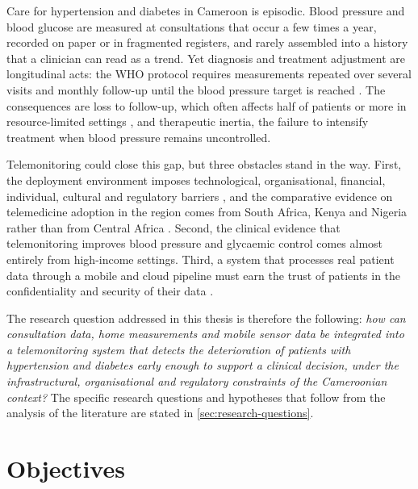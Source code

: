 Care for hypertension and diabetes in Cameroon is episodic. Blood pressure and blood glucose are measured at consultations that occur a few times a year, recorded on paper or in fragmented registers, and rarely assembled into a history that a clinician can read as a trend. Yet diagnosis and treatment adjustment are longitudinal acts: the WHO protocol requires measurements repeated over several visits and monthly follow-up until the blood pressure target is reached \parencite{who2021guideline,who2023hypertension}. The consequences are loss to follow-up, which often affects half of patients or more in resource-limited settings \parencite{who2023hypertension}, and therapeutic inertia, the failure to intensify treatment when blood pressure remains uncontrolled.

Telemonitoring could close this gap, but three obstacles stand in the way. First, the deployment environment imposes technological, organisational, financial, individual, cultural and regulatory barriers \parencite{dodoo2022}, and the comparative evidence on telemedicine adoption in the region comes from South Africa, Kenya and Nigeria rather than from Central Africa \parencite{agbeyangi2025}. Second, the clinical evidence that telemonitoring improves blood pressure and glycaemic control comes almost entirely from high-income settings. Third, a system that processes real patient data through a mobile and cloud pipeline must earn the trust of patients in the confidentiality and security of their data \parencite{alhammad2024}.

The research question addressed in this thesis is therefore the following: \emph{how can consultation data, home measurements and mobile sensor data be integrated into a telemonitoring system that detects the deterioration of patients with hypertension and diabetes early enough to support a clinical decision, under the infrastructural, organisational and regulatory constraints of the Cameroonian context?} The specific research questions and hypotheses that follow from the analysis of the literature are stated in \cref{sec:research-questions}.

\section{Objectives}\label{sec:intro-objectives}

